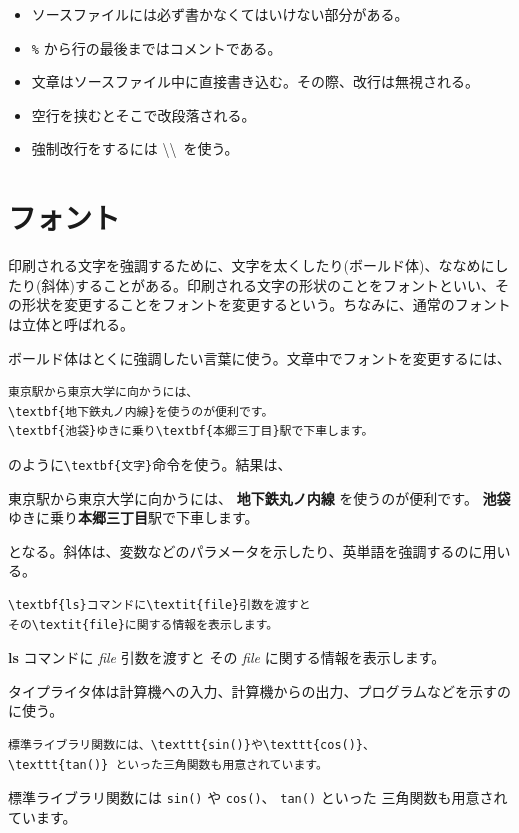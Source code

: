 \begin{itemize}
    \item ソースファイルには必ず書かなくてはいけない部分がある。
    \item \texttt{\%} から行の最後まではコメントである。
    \item 文章はソースファイル中に直接書き込む。その際、改行は無視される。
    \item 空行を挟むとそこで改段落される。
    \item 強制改行をするには \textbackslash\textbackslash\, を使う。
\end{itemize}



\section{フォント}
\label{sec:latex:font}

印刷される文字を強調するために、文字を太くしたり(ボールド体)、ななめにしたり(斜体)することがある。印刷される文字の形状のことをフォントといい、その形状を変更することをフォントを変更するという。ちなみに、通常のフォントは立体と呼ばれる。

ボールド体はとくに強調したい言葉に使う。文章中でフォントを変更するには、
\begin{reidai}
    \begin{verbatim}
東京駅から東京大学に向かうには、
\textbf{地下鉄丸ノ内線}を使うのが便利です。
\textbf{池袋}ゆきに乗り\textbf{本郷三丁目}駅で下車します。
\end{verbatim}
\end{reidai} \noindent
のように\verb|\textbf{文字}|命令を使う。結果は、
\begin{kekka}
    東京駅から東京大学に向かうには、
    \textbf{地下鉄丸ノ内線} を使うのが便利です。
    \textbf{池袋}ゆきに乗り\textbf{本郷三丁目}駅で下車します。
\end{kekka} \noindent
となる。斜体は、変数などのパラメータを示したり、英単語を強調するのに用いる。
\begin{reidai}
    \begin{verbatim}
\textbf{ls}コマンドに\textit{file}引数を渡すと
その\textit{file}に関する情報を表示します。
\end{verbatim}
\end{reidai}
\vspace*{-1.5em}
\begin{kekka}
    \textbf{ls} コマンドに \textit{file} 引数を渡すと
    その \textit{file} に関する情報を表示します。
\end{kekka} \noindent
タイプライタ体は計算機への入力、計算機からの出力、プログラムなどを示すのに使う。
\begin{reidai}
    \begin{verbatim}
標準ライブラリ関数には、\texttt{sin()}や\texttt{cos()}、
\texttt{tan()} といった三角関数も用意されています。
\end{verbatim}
\end{reidai}
\vspace*{-1.5em}
\begin{kekka}
    標準ライブラリ関数には \texttt{sin()} や \texttt{cos()}、
    \texttt{tan()} といった
    三角関数も用意されています。
\end{kekka}

